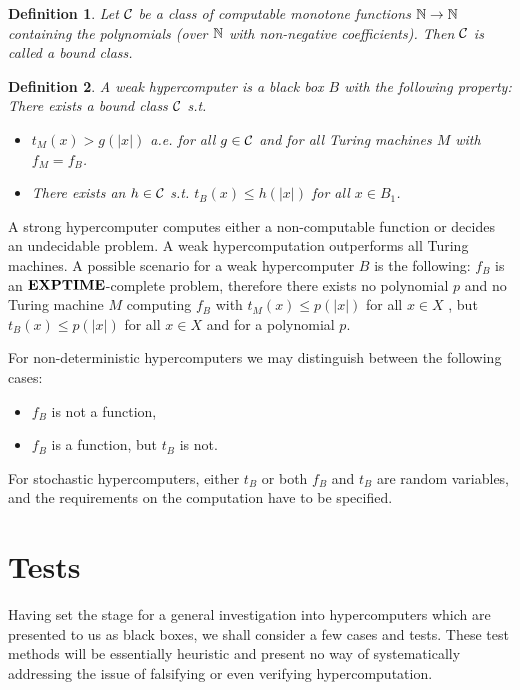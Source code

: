\documentclass[12pt]{article}
\newtheorem{definition}{{\bf Definition} }
\begin{document}
\begin{definition}
Let ${\cal C}$ be a class of computable monotone functions ${\Bbb N} \to
{\Bbb N}$ containing the polynomials (over ${\Bbb N}$ with non-negative
coefficients). Then ${\cal C}$ is called a {\em bound class.}
\end{definition}



\begin{definition}
A {\em weak hypercomputer} is a black box $B$ with the
following property:
%
There exists a bound class ${\cal C}$ s.t.
\begin{itemize}
\item $t_M(x) > g(|x|)$ a.e. for all $g \in {\cal C}$ and for
    all Turing machines $M$ with $f_M =f_B$.
\item There exists an $h \in {\cal C}$ s.t. $t_B(x) \leq h(|x|)$ for
        all $x \in B_1$.
\end{itemize}
\end{definition}

A strong hypercomputer computes either a
non-computable function or decides an undecidable problem. A weak
hypercomputation outperforms all Turing machines. A possible
scenario for a weak hypercomputer $B$ is the following:
%
$f_B$ is an ${\bf EXPTIME}$-complete problem, therefore there exists no
polynomial $p$ and no Turing machine $M$ computing $f_B$ with
$t_M(x) \leq p(|x|)$ for all $x \in X$ , but $t_B(x) \leq p(|x|)$
for all $x \in X$ and for a polynomial $p$.

For non-deterministic hypercomputers we may distinguish between the following cases:
\begin{itemize}
\item $f_B$ is not a function,
\item $f_B$ is a function, but $t_B$ is not.
\end{itemize}

For stochastic hypercomputers, either $t_B$ or both $f_B$ and
$t_B$ are random variables, and the requirements on the computation have to be
specified.




\section{Tests}

Having set the stage for a general investigation into hypercomputers which are presented to us as
black boxes, we shall consider a few cases and tests.
These test methods will be essentially heuristic and present no way of systematically addressing
the issue of falsifying or even verifying hypercomputation.
\end{document}
